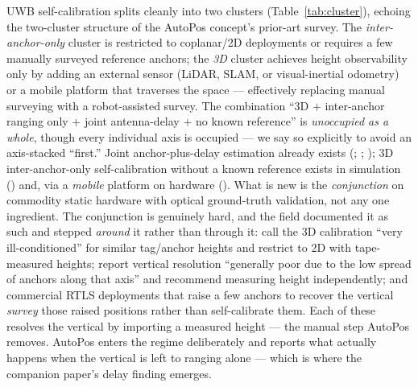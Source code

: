 \documentclass[11pt,a4paper]{article}
\begin{document}
UWB self-calibration splits cleanly into two clusters (Table~\ref{tab:cluster}), echoing the
two-cluster structure of the AutoPos concept's prior-art survey. The \emph{inter-anchor-only}
cluster is restricted to coplanar/2D deployments or requires a few manually surveyed reference
anchors; the \emph{3D} cluster achieves height observability only by adding an external sensor
(LiDAR, SLAM, or visual-inertial odometry) or a mobile platform that traverses the space ---
effectively replacing manual surveying with a robot-assisted survey. The combination ``3D $+$
inter-anchor ranging only $+$ joint antenna-delay $+$ no known reference'' is \emph{unoccupied as a
whole}, though every individual axis is occupied --- we say so explicitly to avoid an axis-stacked
``first.'' Joint anchor-plus-delay estimation already exists (\citealp{shah_2022};
\citealp{piavanini_2022}; \citealp{de_preter_2019}); 3D inter-anchor-only self-calibration without a
known reference exists in simulation (\citealp{pereira_2021}) and, via a \emph{mobile} platform on
hardware (\citealp{batstone_2017}). What is new is the \emph{conjunction} on commodity static
hardware with optical ground-truth validation, not any one ingredient. The conjunction is genuinely
hard, and the field documented it as such and stepped \emph{around} it rather than through it:
\citet{de_preter_2019} call the 3D calibration ``very ill-conditioned'' for similar tag/anchor heights
and restrict to 2D with tape-measured heights; \citet{corbalan_2023} report vertical resolution
``generally poor due to the low spread of anchors along that axis'' and recommend measuring height
independently; and commercial RTLS deployments that raise a few anchors to recover the vertical
\emph{survey} those raised positions rather than self-calibrate them. Each of these resolves the
vertical by importing a measured height --- the manual step AutoPos removes. AutoPos enters the regime
deliberately and reports what actually happens when the vertical is left to ranging alone --- which is
where the companion paper's delay finding emerges.
\end{document}
